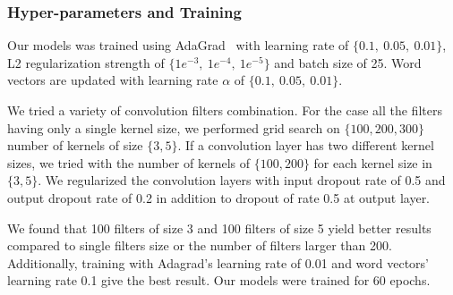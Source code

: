 \subsubsection{Hyper-parameters and Training}
Our models was trained using AdaGrad~\cite{duchi2011adaptive} with learning rate of $\{0.1,~ 0.05,~ 0.01\}$, L2 regularization strength of $\{1e^{-3},~ 1e^{-4}, ~ 1e^{-5} \}$ and batch size of 25.
Word vectors are updated with learning rate $\alpha$ of $\{0.1,~0.05, ~0.01\}$.

We tried a variety of convolution filters combination.
For the case all the filters having only a single kernel size, we performed grid search on $\{100, 200, 300\}$ number of kernels of size $\{3, 5\}$.
If a convolution layer has two different kernel sizes, we tried with the number of kernels of $\{100, 200\}$ for each kernel size in $\{3, 5\}$.
We regularized the convolution layers with input dropout rate of 0.5 and output dropout rate of 0.2 in addition to dropout of rate 0.5 at output layer.

We found that 100 filters of size 3 and 100 filters of size 5 yield better results compared to single filters size or the number of filters larger than 200. 
Additionally, training with Adagrad's learning rate of 0.01 and word vectors' learning rate 0.1 give the best result. 
Our models were trained for 60 epochs.
